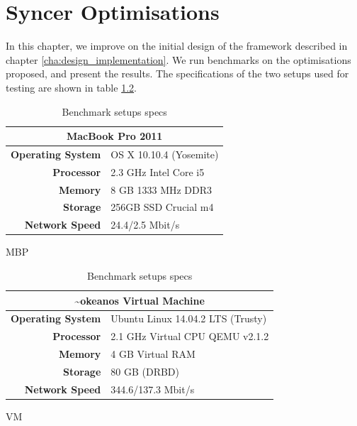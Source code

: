 
\chapter{Syncer Optimisations}
In this chapter, we improve on the initial design of the framework described in chapter \ref{cha:design_implementation}. We run benchmarks on the optimisations proposed, and present the results. The specifications of the two setups used for testing are shown in table \ref{table:benchmark-specs}.

\begin{table}[H]
  \centering
  \begin{adjustbox}{max width=1.2\textwidth, center}
    \begin{subtable}{0.5\textwidth}
      \begin{tabular}{|r|l|} \hline
        \multicolumn{2}{|c|}{\textbf{MacBook Pro 2011}} \\ \hline
        \textbf{Operating System} & OS X 10.10.4 (Yosemite)\\ \hline
        \textbf{Processor} & 2.3 GHz Intel Core i5\\ \hline
        \textbf{Memory} & 8 GB 1333 MHz DDR3 \\ \hline
        \textbf{Storage} & 256GB SSD Crucial m4\\ \hline
        \textbf{Network Speed} & 24.4/2.5 Mbit/s\\ \hline
      \end{tabular}
      \caption{MBP}
    \end{subtable}

    \begin{subtable}{0.5\textwidth}
      \begin{tabular}{|r|l|} \hline
        \multicolumn{2}{|c|}{\textbf{\textasciitilde okeanos Virtual Machine}}
        \\ \hline
        \textbf{Operating System} & Ubuntu Linux 14.04.2 LTS (Trusty)\\ \hline
        \textbf{Processor} & 2.1 GHz Virtual CPU QEMU v2.1.2 \\ \hline
        \textbf{Memory} & 4 GB Virtual RAM \\ \hline
        \textbf{Storage} & 80 GB (DRBD) \\ \hline
        \textbf{Network Speed} & 344.6/137.3 Mbit/s\\ \hline
      \end{tabular}
      \caption{VM}
    \end{subtable}
  \end{adjustbox}
  \caption{Benchmark setups specs}
  \label{table:benchmark-specs}
\end{table}

